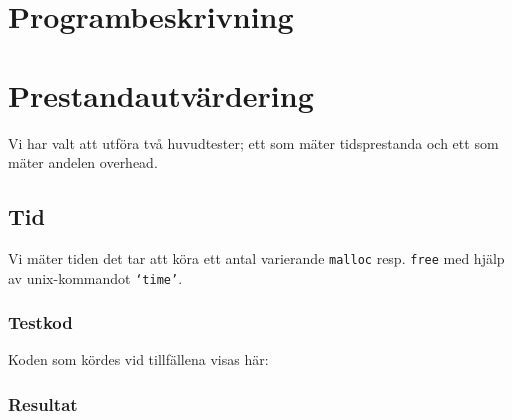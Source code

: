 \documentclass[a4paper,10pt,titlepage]{article}
\begin{document}
\newpage
\section{Programbeskrivning}



\newpage
\section{Prestandautvärdering}


Vi har valt att utföra två huvudtester; ett som mäter tidsprestanda och ett som mäter andelen overhead.

\subsection{Tid}

Vi mäter tiden det tar att köra ett antal varierande \texttt{malloc} resp. \texttt{free} med hjälp av unix-kommandot \texttt{`time'}.


\subsubsection{Testkod}

Koden som kördes vid tillfällena visas här:

\footnotesize{}

\subsubsection{Resultat}
\end{document}
